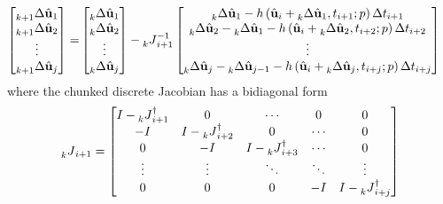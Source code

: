 \begin{equation}
    \begin{split}
    \begin{bmatrix}
    \prescript{}{k+1} \Delta \hat{\textbf{u}}_{1}\\ 
    \prescript{}{k+1} \Delta \hat{\textbf{u}}_{2}\\ 
    \vdots\\ 
    \prescript{}{k+1} \Delta \hat{\textbf{u}}_{j}
    \end{bmatrix} = & \begin{bmatrix}
    \prescript{}{k} \Delta \hat{\textbf{u}}_{1}\\ 
    \prescript{}{k} \Delta \hat{\textbf{u}}_{2}\\ 
    \vdots\\ 
    \prescript{}{k} \Delta \hat{\textbf{u}}_{j}
    \end{bmatrix} - \prescript{}{k}{J}_{i+1}^{-1} \begin{bmatrix}
    \prescript{}{k} \Delta \hat{\textbf{u}}_{1} - h\left(\hat{\textbf{u}}_{i} + \prescript{}{k} \Delta \hat{\textbf{u}}_{1}, t_{i+1}; p \right) \Delta t_{i+1}\\ 
    \prescript{}{k} \Delta \hat{\textbf{u}}_{2} - \prescript{}{k} \Delta \hat{\textbf{u}}_{1} - h\left(\hat{\textbf{u}}_{i} + \prescript{}{k} \Delta \hat{\textbf{u}}_{2}, t_{i+2}; p \right) \Delta t_{i+2}\\ 
    \vdots\\ 
    \prescript{}{k} \Delta \hat{\textbf{u}}_{j} - \prescript{}{k} \Delta \hat{\textbf{u}}_{j-1} - h\left(\hat{\textbf{u}}_{i} + \prescript{}{k} \Delta \hat{\textbf{u}}_{j}, t_{i+j}; p \right) \Delta t_{i+j}
    \end{bmatrix}
    \end{split}
    \label{eq:batched-update}
\end{equation}
where the chunked discrete Jacobian has a bidiagonal form
\begin{equation}
    \prescript{}{k}{J}_{i+1} = \begin{bmatrix}
I - \prescript{}{k}J_{i+1}^\dagger & 0  & \cdots & 0 & 0 \\ 
-I & I - \prescript{}{k}J_{i+2}^\dagger  & 0  & \cdots & 0 \\ 
0 & -I & I - \prescript{}{k}J_{i+3}^\dagger  & \cdots  & 0 \\ 
\vdots  & \vdots  & \ddots & \ddots  & \vdots \\
0 & 0 & 0  & -I &  I - \prescript{}{k}J_{i+j}^\dagger
\end{bmatrix}
\end{equation}
